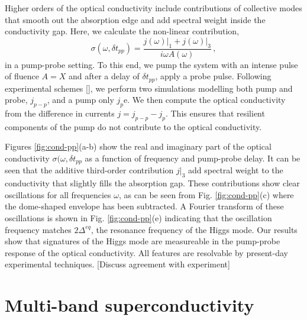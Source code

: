 \documentclass[aps,prb,reprint,noeprint,superscriptaddress]{revtex4-1}
\begin{document}
Higher orders of the optical conductivity include
contributions of collective modes that smooth out the absorption
edge and add spectral weight inside the conductivity gap.
Here, we calculate the non-linear contribution,
$$\sigma(\omega, \delta t_{pp})=\frac{j(\omega)\big|_1+j(\omega)\big|_3}{i\omega
A(\omega)} \,,$$
in a pump-probe setting. To this end, we pump the system with an intense 
pulse of fluence $A=X$ and after a delay of $\delta t_{pp}$, apply a probe
pulse. Following experimental schemes [], we perform two simulations modelling
both pump and probe, $j_{p-p}$, and a pump only $j_{p}$e. 
We then compute the optical conductivity
from the difference in currents $j=j_{p-p}-j_{p}$. This ensures that resilient
components of the pump do not contribute to the optical conductivity.

Figures \ref{fig:cond-pp}(a-b) show the real and imaginary part of the optical
conductivity $\sigma(\omega,\delta t_{pp}$ as a function of frequency and
  pump-probe delay. It can be seen that the additive third-order contribution
  $j\big|_3$ add spectral weight to the conductivity that slightly fills the
  absorption gap. These contributions show clear oscillations for all
  frequencies $\omega$, as can be seen from Fig. \ref{fig:cond-pp}(c) where
  the dome-shaped envelope has been subtracted. A Fourier transform of these
  oscillations is shown in Fig. \ref{fig:cond-pp}(e) indicating that the
  oscillation frequency matches $2\Delta^{eq}$, the resonance frequency of the
  Higgs mode. Our results show that signatures of the Higgs mode are measureable
  in the pump-probe response of the optical conductivity. All features are
  resolvable by present-day experimental techniques. [Discuss agreement with
  experiment]







\section{Multi-band superconductivity}
\label{sec:multiband}
\end{document}
